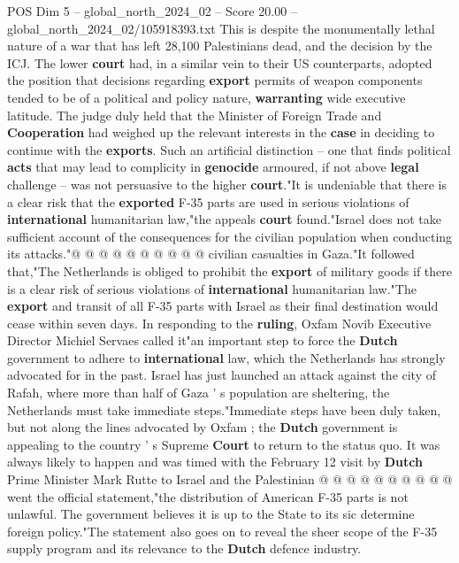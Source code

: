 \begin{textsample}{POS Dim 5 – global\_north\_2024\_02 – Score 20.00 – global\_north\_2024\_02/105918393.txt}
This is despite the monumentally lethal nature of a war that has left 28,100 Palestinians dead, and the decision by the ICJ.
The lower \textbf{court} had, in a similar vein to their US counterparts, adopted the position that decisions regarding \textbf{export} permits of weapon components tended to be of a political and policy nature, \textbf{warranting} wide executive latitude.
The judge duly held that the Minister of Foreign Trade and \textbf{Cooperation} had weighed up the relevant interests in the \textbf{case} in deciding to continue with the \textbf{exports}.
Such an artificial distinction -- one that finds political \textbf{acts} that may lead to complicity in \textbf{genocide} armoured, if not above \textbf{legal} challenge -- was not persuasive to the higher \textbf{court}."It is undeniable that there is a clear risk that the \textbf{exported} F-35 parts are used in serious violations of \textbf{international} humanitarian law,"the appeals \textbf{court} found."Israel does not take sufficient account of the consequences for the civilian population when conducting its attacks."@ @ @ @ @ @ @ @ @ @ civilian casualties in Gaza."It followed that,"The Netherlands is obliged to prohibit the \textbf{export} of military goods if there is a clear risk of serious violations of \textbf{international} humanitarian law."The \textbf{export} and transit of all F-35 parts with Israel as their final destination would cease within seven days.
In responding to the \textbf{ruling}, Oxfam Novib Executive Director Michiel Servaes called it"an important step to force the \textbf{Dutch} government to adhere to \textbf{international} law, which the Netherlands has strongly advocated for in the past.
Israel has just launched an attack against the city of Rafah, where more than half of Gaza ' s population are sheltering, the Netherlands must take immediate steps."Immediate steps have been duly taken, but not along the lines advocated by Oxfam ; the \textbf{Dutch} government is appealing to the country ' s Supreme \textbf{Court} to return to the status quo.
It was always likely to happen and was timed with the February 12 visit by \textbf{Dutch} Prime Minister Mark Rutte to Israel and the Palestinian @ @ @ @ @ @ @ @ @ @ went the official statement,"the distribution of American F-35 parts is not unlawful.
The government believes it is up to the State to its sic determine foreign policy."The statement also goes on to reveal the sheer scope of the F-35 supply program and its relevance to the \textbf{Dutch} defence industry.

\end{textsample}
